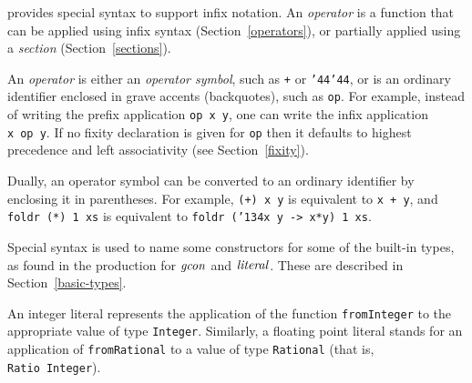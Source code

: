 \Haskell{} provides special syntax to support infix notation.
An {\em operator} is a function that can be applied using infix 
syntax (Section~\ref{operators}), or partially applied using a
{\em section} (Section~\ref{sections}).

An {\em operator} is either an {\em operator symbol}, such as \mbox{\tt +} or \mbox{\tt {\char'44}{\char'44}},
or is an ordinary identifier enclosed in grave accents (backquotes), such
as \bkqB\mbox{\tt op}\bkqA.  For example, instead of writing the prefix application
\mbox{\tt op\ x\ y}, one can write the infix application \mbox{\mbox{\tt x} \bkqB\mbox{\tt op}\bkqA\mbox{\tt \ y}}.
If no fixity
declaration is given for \bkqB\mbox{\tt op}\bkqA{} then it defaults
to highest precedence and left associativity
(see Section~\ref{fixity}).

Dually, an operator symbol can be converted to an ordinary identifier
by enclosing it in parentheses.  For example, \mbox{\tt (+)\ x\ y} is equivalent
to \mbox{\tt x\ +\ y}, and \mbox{\tt foldr\ (*)\ 1\ xs} is equivalent to \mbox{\tt foldr\ ({\char'134}x\ y\ ->\ x*y)\ 1\ xs}.


Special syntax is used to name some constructors for some of the
built-in types, as found
in the production for \mbox{$\it gcon$} and \mbox{$\it literal$}.  These are described
in Section~\ref{basic-types}.

An integer literal represents the
application of the function \mbox{\tt fromInteger} to the
appropriate value of type 
\mbox{\tt Integer}.  Similarly, a floating point literal stands for an application of
\mbox{\tt fromRational} to a value of type \mbox{\tt Rational} (that is, 
\mbox{\tt Ratio\ Integer}).

